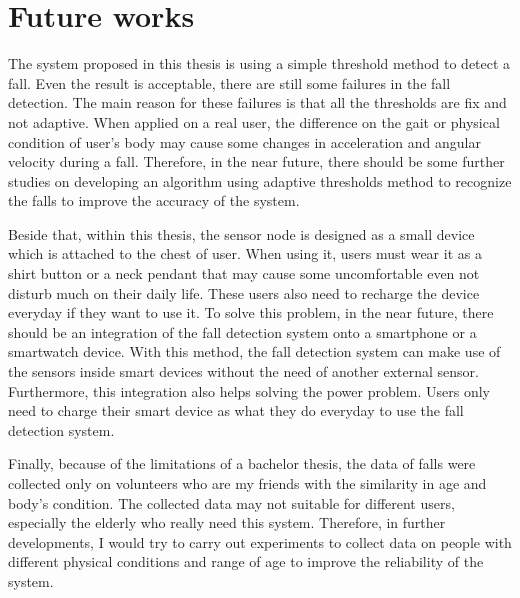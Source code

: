 \documentclass[letterpaper,12pt,titlepage,oneside,final]{book}
\begin{document}
\section{Future works}
The system proposed in this thesis is using a simple threshold method to detect a fall. Even the result is acceptable, there are still some failures in the fall detection. The main reason for these failures is that all the thresholds are fix and not adaptive. When applied on a  real user, the difference on the gait or physical condition of user's body may cause some changes in acceleration and angular velocity during a fall. Therefore, in the near future, there should be some further studies on developing an algorithm using adaptive thresholds method to recognize the falls to improve the accuracy of the system. 
\par
Beside that, within this thesis, the sensor node is designed as a small device which is attached to the chest of user. When using it, users must wear it as a shirt button or a neck pendant that may cause some uncomfortable even not disturb much on their daily life. These users also need to recharge the device everyday if they want to use it. To solve this problem, in the near future, there should be an integration of the fall detection system onto a smartphone or a smartwatch device. With this method, the fall detection system can make use of the sensors inside smart devices without the need of another external sensor. Furthermore, this integration also helps solving the power problem. Users only need to charge their smart device as what they do everyday to use the fall detection system.
\par 
Finally, because of the limitations of a bachelor thesis, the data of falls were collected only on volunteers who are my friends with the similarity in age and body's condition. The collected data may not suitable for different users, especially the elderly who really need this system. Therefore, in further developments, I would try to carry out experiments to collect data on people with different physical conditions and range of age to improve the reliability of the system. 
\appendix
\end{document}
